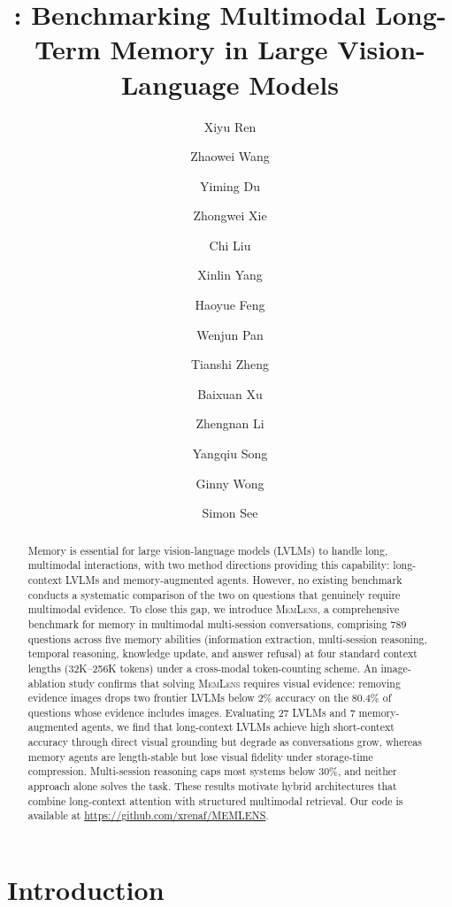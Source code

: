 \documentclass{llmxive}
\title{\bench{}: Benchmarking Multimodal Long-Term Memory in Large Vision-Language Models}
\author{Xiyu Ren \and Zhaowei Wang \and Yiming Du \and Zhongwei Xie \and Chi Liu \and Xinlin Yang \and Haoyue Feng \and Wenjun Pan \and Tianshi Zheng \and Baixuan Xu \and Zhengnan Li \and Yangqiu Song \and Ginny Wong \and Simon See}
\providecommand{\bench}{\textsc{MemLens}}
\begin{document}
\maketitle
\begin{abstract}
Memory is essential for large vision-language models (LVLMs) to handle long, multimodal interactions, with two method directions providing this capability: long-context LVLMs and memory-augmented agents. However, no existing benchmark conducts a systematic comparison of the two on questions that genuinely require multimodal evidence. To close this gap, we introduce \bench{}, a comprehensive benchmark for memory in multimodal multi-session conversations, comprising 789 questions across five memory abilities (information extraction, multi-session reasoning, temporal reasoning, knowledge update, and answer refusal) at four standard context lengths (32K--256K tokens) under a cross-modal token-counting scheme. An image-ablation study confirms that solving \bench{} requires visual evidence: removing evidence images drops two frontier LVLMs below 2\% accuracy on the 80.4\% of questions whose evidence includes images. Evaluating 27 LVLMs and 7 memory-augmented agents, we find that long-context LVLMs achieve high short-context accuracy through direct visual grounding but degrade as conversations grow, whereas memory agents are length-stable but lose visual fidelity under storage-time compression. Multi-session reasoning caps most systems below 30\%, and neither approach alone solves the task. These results motivate hybrid architectures that combine long-context attention with structured multimodal retrieval. Our code is available at \url{https://github.com/xrenaf/MEMLENS}.
\end{abstract}
\section{Introduction}
\label{sec:intro}
\end{document}
